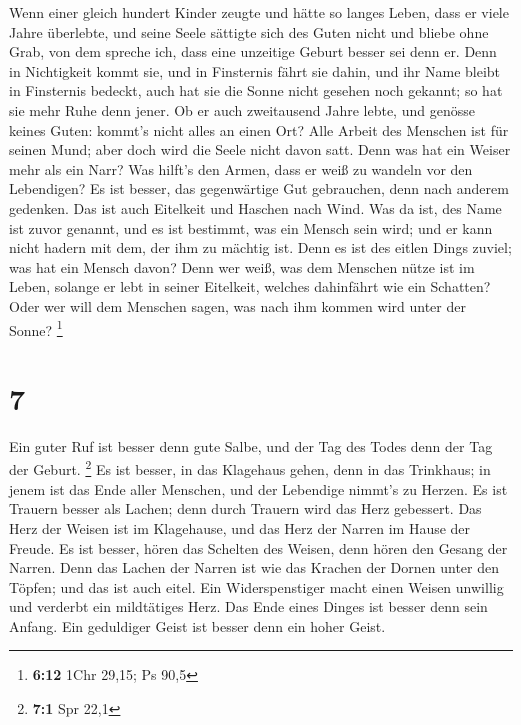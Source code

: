  Wenn einer gleich hundert Kinder zeugte und hätte so langes
Leben, dass er viele Jahre überlebte, und seine Seele sättigte sich des
Guten nicht und bliebe ohne Grab, von dem spreche ich, dass eine
unzeitige Geburt besser sei denn er.  Denn in Nichtigkeit
kommt sie, und in Finsternis fährt sie dahin, und ihr Name bleibt in
Finsternis bedeckt,  auch hat sie die Sonne nicht gesehen
noch gekannt; so hat sie mehr Ruhe denn jener.  Ob er auch
zweitausend Jahre lebte, und genösse keines Guten: kommt's nicht alles
an einen Ort?  Alle Arbeit des Menschen ist für seinen Mund;
aber doch wird die Seele nicht davon satt.  Denn was hat ein
Weiser mehr als ein Narr? Was hilft's den Armen, dass er weiß zu wandeln
vor den Lebendigen?  Es ist besser, das gegenwärtige Gut
gebrauchen, denn nach anderem gedenken. Das ist auch Eitelkeit und
Haschen nach Wind.  Was da ist, des Name ist zuvor genannt,
und es ist bestimmt, was ein Mensch sein wird; und er kann nicht hadern
mit dem, der ihm zu mächtig ist.  Denn es ist des eitlen
Dings zuviel; was hat ein Mensch davon?  Denn wer weiß, was
dem Menschen nütze ist im Leben, solange er lebt in seiner Eitelkeit,
welches dahinfährt wie ein Schatten? Oder wer will dem Menschen sagen,
was nach ihm kommen wird unter der Sonne? \footnote{\textbf{6:12} 1Chr
  29,15; Ps 90,5}

\hypertarget{section-2}{%
\section{7}\label{section-2}}

 Ein guter Ruf ist besser denn gute Salbe, und der Tag des
Todes denn der Tag der Geburt. \footnote{\textbf{7:1} Spr 22,1}
 Es ist besser, in das Klagehaus gehen, denn in das
Trinkhaus; in jenem ist das Ende aller Menschen, und der Lebendige
nimmt's zu Herzen.  Es ist Trauern besser als Lachen; denn
durch Trauern wird das Herz gebessert.  Das Herz der Weisen
ist im Klagehause, und das Herz der Narren im Hause der Freude.
 Es ist besser, hören das Schelten des Weisen, denn hören
den Gesang der Narren.  Denn das Lachen der Narren ist wie
das Krachen der Dornen unter den Töpfen; und das ist auch eitel.
 Ein Widerspenstiger macht einen Weisen unwillig und
verderbt ein mildtätiges Herz.  Das Ende eines Dinges ist
besser denn sein Anfang. Ein geduldiger Geist ist besser denn ein hoher
Geist.

